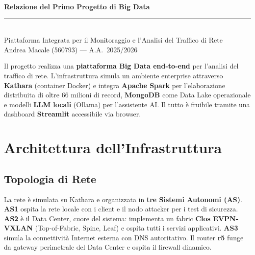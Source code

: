 \documentclass[10pt,a4paper]{article}
\begin{document}
\thispagestyle{plain}
\begin{center}
  {\fontsize{18}{24}\selectfont\textbf{Relazione del Primo Progetto di Big Data}}\\[4mm]
  \rule{\textwidth}{1.5pt}\\[4mm]
  {\large Piattaforma Integrata per il Monitoraggio e l'Analisi del Traffico di Rete}\\[6mm]
  {\normalsize Andrea Macale (560793) \quad — \quad A.A.\ 2025/2026}\\[2mm]
\end{center}

\noindent
Il progetto realizza una \textbf{piattaforma Big Data end-to-end} per l'analisi del traffico di rete.
L'infrastruttura simula un ambiente enterprise attraverso \textbf{Kathara} (container Docker) e integra
\textbf{Apache Spark} per l'elaborazione distribuita di oltre 66 milioni di record, \textbf{MongoDB}
come Data Lake operazionale e modelli \textbf{LLM locali} (Ollama) per l'assistente AI.
Il tutto è fruibile tramite una dashboard \textbf{Streamlit} accessibile via browser.

\section{Architettura dell'Infrastruttura}

\subsection{Topologia di Rete}
La rete è simulata su Kathara e organizzata in \textbf{tre Sistemi Autonomi (AS)}.
\textbf{AS1} ospita la rete locale con i client e il nodo attacker per i test di sicurezza.
\textbf{AS2} è il Data Center, cuore del sistema: implementa un fabric \textbf{Clos EVPN-VXLAN}
(Top-of-Fabric, Spine, Leaf) e ospita tutti i servizi applicativi.
\textbf{AS3} simula la connettività Internet esterna con DNS autoritativo.
Il router \textbf{r5} funge da gateway perimetrale del Data Center e ospita il firewall dinamico.
\end{document}
